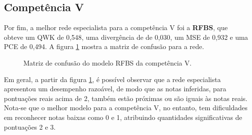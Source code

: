 \subsection{Competência V}
\label{subsec:eval-c5}

Por fim, a melhor rede especialista para a competência V foi a \textbf{RFBS}, que obteve um QWK de 0,548, uma divergência de de 0,030, um MSE de 0,932 e uma PCE de 0,494. A figura \ref{fig:eval-c5-confusion-matrix} mostra a matriz de confusão para a rede.

\begin{figure}[H]
    \centering
    \resizebox{0.5\textwidth}{!}{}
    \caption{Matriz de confusão do modelo RFBS da competência V.}
    \label{fig:eval-c5-confusion-matrix}
\end{figure}

Em geral, a partir da figura \ref{fig:eval-c5-confusion-matrix}, é possível observar que a rede especialista apresentou um desempenho razoável, de modo que as notas inferidas, para pontuações reais acima de 2, também estão próximas ou são iguais às notas reais. Nota-se que o melhor modelo para a competência V, no entanto, tem dificuldades em reconhecer notas baixas como 0 e 1, atribuindo quantidades significativas de pontuações 2 e 3.
